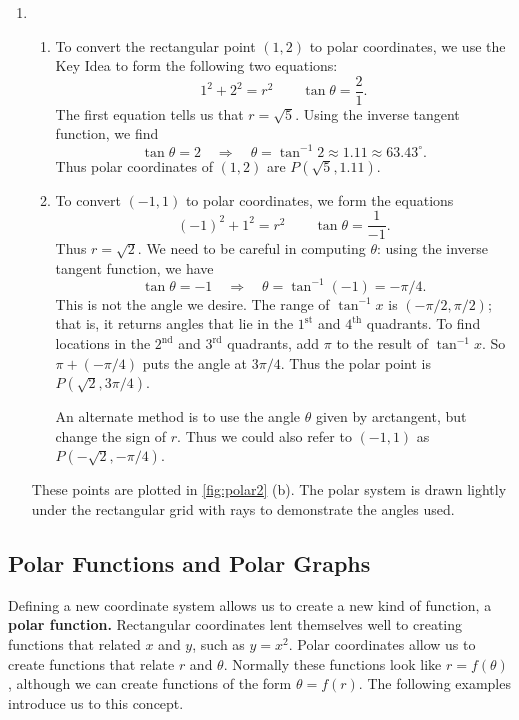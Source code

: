 {\begin{enumerate}
	\item \begin{enumerate}
		\item To convert the rectangular point $(1,2)$ to polar coordinates, we use the Key Idea to form the following two equations:
		$$1^2+2^2 = r^2 \qquad \tan \theta = \frac{2}{1}.$$
		The first equation tells us that $r=\sqrt{5}$. Using the inverse tangent function, we find
		$$\tan \theta = 2 \quad \Rightarrow \quad \theta = \tan^{-1} 2 \approx 1.11\approx 63.43^\circ.$$
		Thus polar coordinates of $(1,2)$ are $P(\sqrt{5},1.11)$.
		\item		To convert $(-1,1)$ to polar coordinates, we form the equations 
		$$(-1)^2+1^2=r^2 \qquad \tan \theta = \frac{1}{-1}.$$
		Thus $r=\sqrt{2}$. We need to be careful in computing $\theta$: using the inverse tangent function, we have $$\tan\theta = -1 \quad \Rightarrow \quad \theta = \tan^{-1}(-1) = -\pi/4.$$
		This is not the angle we desire. The range of $\tan^{-1}x $ is $(-\pi/2,\pi/2)$; that is, it returns angles that lie in the $1^\text{st}$ and $4^\text{th}$ quadrants. To find locations in the $2^\text{nd}$  and $3^\text{rd}$ quadrants, add $\pi$ to the result of $\tan^{-1}x$. So  $\pi+(-\pi/4)$ puts the angle at $3\pi/4$. Thus the polar point is $P(\sqrt{2},3\pi/4)$.
		
		An alternate method is to use the angle $\theta$ given by arctangent, but change the sign of $r$. Thus we could also refer to $(-1,1)$ as\\ $P(-\sqrt{2},-\pi/4)$.
	\end{enumerate}
These points are plotted in \autoref{fig:polar2} (b). The polar system is drawn lightly under the rectangular grid with rays to demonstrate the angles used.\eoehere
\end{enumerate}}

\subsection*{Polar Functions and Polar Graphs}

Defining a new coordinate system allows us to create a new kind of function, a \textbf{polar function.} Rectangular coordinates lent themselves well to creating functions that related $x$ and $y$, such as $y=x^2.$ Polar coordinates allow us to create functions that relate $r$ and $\theta$. Normally these functions look like $r=f(\theta)$, although we can create functions of the form $\theta = f(r)$. The following examples introduce us to this concept.

